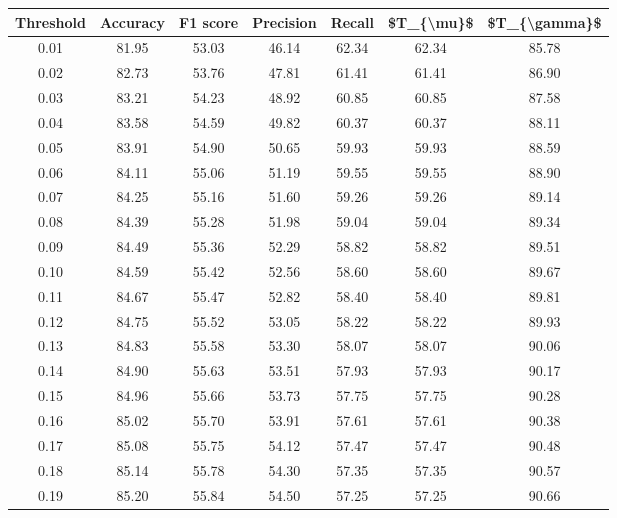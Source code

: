 \begin{tabular}{|c|c|c|c|c|c|c|}
\hline
 Threshold &  Accuracy &  F1 score &  Precision &  Recall &  \$T\_\{\textbackslash mu\}\$ &  \$T\_\{\textbackslash gamma\}\$ \\
\hline
      0.01 &     81.95 &     53.03 &      46.14 &   62.34 &      62.34 &         85.78 \\
      0.02 &     82.73 &     53.76 &      47.81 &   61.41 &      61.41 &         86.90 \\
      0.03 &     83.21 &     54.23 &      48.92 &   60.85 &      60.85 &         87.58 \\
      0.04 &     83.58 &     54.59 &      49.82 &   60.37 &      60.37 &         88.11 \\
      0.05 &     83.91 &     54.90 &      50.65 &   59.93 &      59.93 &         88.59 \\
      0.06 &     84.11 &     55.06 &      51.19 &   59.55 &      59.55 &         88.90 \\
      0.07 &     84.25 &     55.16 &      51.60 &   59.26 &      59.26 &         89.14 \\
      0.08 &     84.39 &     55.28 &      51.98 &   59.04 &      59.04 &         89.34 \\
      0.09 &     84.49 &     55.36 &      52.29 &   58.82 &      58.82 &         89.51 \\
      0.10 &     84.59 &     55.42 &      52.56 &   58.60 &      58.60 &         89.67 \\
      0.11 &     84.67 &     55.47 &      52.82 &   58.40 &      58.40 &         89.81 \\
      0.12 &     84.75 &     55.52 &      53.05 &   58.22 &      58.22 &         89.93 \\
      0.13 &     84.83 &     55.58 &      53.30 &   58.07 &      58.07 &         90.06 \\
      0.14 &     84.90 &     55.63 &      53.51 &   57.93 &      57.93 &         90.17 \\
      0.15 &     84.96 &     55.66 &      53.73 &   57.75 &      57.75 &         90.28 \\
      0.16 &     85.02 &     55.70 &      53.91 &   57.61 &      57.61 &         90.38 \\
      0.17 &     85.08 &     55.75 &      54.12 &   57.47 &      57.47 &         90.48 \\
      0.18 &     85.14 &     55.78 &      54.30 &   57.35 &      57.35 &         90.57 \\
      0.19 &     85.20 &     55.84 &      54.50 &   57.25 &      57.25 &         90.66 \\

\end{tabular}
